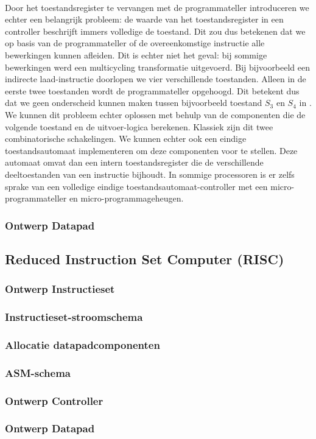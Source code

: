 \paragraph{}
Door het toestandsregister te vervangen met de programmateller introduceren we echter een belangrijk probleem: de waarde van het toestandsregister in een controller beschrijft immers volledige de toestand. Dit zou dus betekenen dat we op basis van de programmateller of de overeenkomstige instructie alle bewerkingen kunnen afleiden. Dit is echter niet het geval: bij sommige bewerkingen werd een multicycling transformatie uitgevoerd. Bij bijvoorbeeld een indirecte laad-instructie doorlopen we vier verschillende toestanden. Alleen in de eerste twee toestanden wordt de programmateller opgehoogd. Dit betekent dus dat we geen onderscheid kunnen maken tussen bijvoorbeeld toestand $S_3$ en $S_4$ in . We kunnen dit probleem echter oplossen met behulp van de componenten die de volgende toestand en de uitvoer-logica berekenen. Klassiek zijn dit twee combinatorische schakelingen. We kunnen echter ook een eindige toestandsautomaat implementeren om deze componenten voor te stellen. Deze automaat omvat dan een intern toestandsregister die de verschillende deeltoestanden van een instructie bijhoudt. In sommige processoren is er zelfs sprake van een volledige eindige toestandsautomaat-controller met een micro-programmateller en micro-programmageheugen.
\subsubsection{Ontwerp Datapad}
\subsection{Reduced Instruction Set Computer (RISC)}
\subsubsection{Ontwerp Instructieset}
\subsubsection{Instructieset-stroomschema}
\subsubsection{Allocatie datapadcomponenten}
\subsubsection{ASM-schema}
\subsubsection{Ontwerp Controller}
\subsubsection{Ontwerp Datapad}